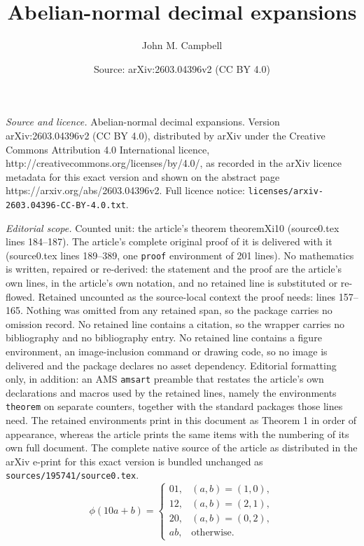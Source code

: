 \documentclass[10pt,a4paper]{amsart}
\title{Abelian-normal decimal expansions}
\author{John M. Campbell}
\date{Source: arXiv:2603.04396v2 (CC BY 4.0)}
\begin{document}
\maketitle

\noindent\emph{Source and licence.} Abelian-normal decimal expansions. Version arXiv:2603.04396v2 (CC BY 4.0), distributed by arXiv under the Creative Commons Attribution 4.0 International licence, http://creativecommons.org/licenses/by/4.0/, as recorded in the arXiv licence metadata for this exact version and shown on the abstract page https://arxiv.org/abs/2603.04396v2. Full licence notice: \texttt{licenses/arxiv-2603.04396-CC-BY-4.0.txt}.\par\smallskip

\noindent\textit{Editorial scope.} Counted unit: the article's theorem theoremXi10 (source0.tex lines 184--187). The article's complete original proof of it is delivered with it (source0.tex lines 189--389, one \texttt{proof} environment of 201 lines). No mathematics is written, repaired or re-derived: the statement and the proof are the article's own lines, in the article's own notation, and no retained line is substituted or re-flowed.  Retained uncounted as the source-local context the proof needs: lines 157--165.  Nothing was omitted from any retained span, so the package carries no omission record.  No retained line contains a citation, so the wrapper carries no bibliography and no bibliography entry.  No retained line contains a figure environment, an image-inclusion command or drawing code, so no image is delivered and the package declares no asset dependency.  Editorial formatting only, in addition: an AMS \texttt{amsart} preamble that restates the article's own declarations and macros used by the retained lines, namely the environments \texttt{theorem} on separate counters, together with the standard packages those lines need.  The retained environments print in this document as Theorem 1 in order of appearance, whereas the article prints the same items with the numbering of its own full document.  The complete native source of the article as distributed in the arXiv e-print for this exact version is bundled unchanged as \texttt{sources/195741/source0.tex}.
\begin{equation}\label{definephi}
 \phi(10a+b)=
 \begin{cases}
 01, & (a,b)=(1,0),\\
 12, & (a,b)=(2,1),\\
 20, & (a,b)=(0,2),\\
 ab, & \text{otherwise.}
 \end{cases}
\end{equation}
\end{document}
